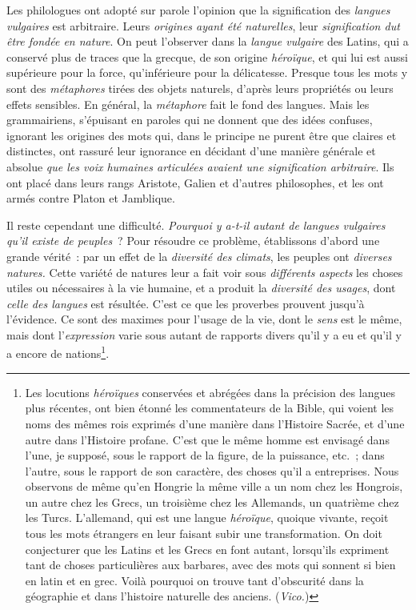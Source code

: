 \documentclass[french,twoside]{book} %
\begin{document}
Les philologues ont adopté sur parole l’opinion que la signification des {\itshape langues vulgaires} est arbitraire. Leurs {\itshape origines ayant été naturelles}, leur {\itshape signification dut être fondée en nature}. On peut l’observer dans la {\itshape langue vulgaire} des Latins, qui a conservé plus de traces que la grecque, de son origine {\itshape héroïque}, et qui lui est aussi supérieure pour la force, qu’inférieure pour la délicatesse. Presque tous les mots y sont des {\itshape métaphores} tirées des objets naturels, d’après leurs propriétés ou leurs effets sensibles. En général, la {\itshape métaphore} fait le fond des langues. Mais les grammairiens, s’épuisant en paroles qui ne donnent que des idées confuses, ignorant les origines des mots qui, dans le principe ne purent être que claires et distinctes, ont rassuré leur ignorance en décidant d’une manière générale et absolue {\itshape que les voix humaines articulées avaient une signification arbitraire}. Ils ont placé dans leurs rangs Aristote, Galien et d’autres philosophes, et les ont armés contre Platon et Jamblique.\par
Il reste cependant une difficulté. {\itshape Pourquoi y a-t-il autant de langues vulgaires qu’il existe de peuples} ? Pour résoudre ce problème, établissons d’abord une grande vérité : par un effet de la {\itshape diversité des climats}, les peuples ont {\itshape diverses natures.}  Cette variété de natures leur a fait voir sous {\itshape différents aspects} les choses utiles ou nécessaires à la vie humaine, et a produit la {\itshape diversité des usages}, dont {\itshape celle des langues} est résultée. C’est ce que les proverbes prouvent jusqu’à l’évidence. Ce sont des maximes pour l’usage de la vie, dont le {\itshape sens} est le même, mais dont l’{\itshape expression} varie sous autant de rapports divers qu’il y a eu et qu’il y a encore de nations\footnote{Les locutions {\itshape héroïques} conservées et abrégées dans la précision des langues plus récentes, ont bien étonné les commentateurs de la Bible, qui voient les noms des mêmes rois exprimés d’une manière dans l’Histoire Sacrée, et d’une autre dans l’Histoire profane. C’est que le même homme est envisagé dans l’une, je supposé, sous le rapport de la figure, de la puissance, etc. ; dans l’autre, sous le rapport de son caractère, des choses qu’il a entreprises. Nous observons de même qu’en Hongrie la même ville a un nom chez les Hongrois, un autre chez les Grecs, un troisième chez les Allemands, un quatrième chez les Turcs. L’allemand, qui est une langue {\itshape héroïque}, quoique vivante, reçoit tous les mots étrangers en leur faisant subir une transformation. On doit conjecturer que les Latins et les Grecs en font autant, lorsqu’ils expriment tant de choses particulières aux barbares, avec des mots qui sonnent si bien en latin et en grec. Voilà pourquoi on trouve tant d’obscurité dans la géographie et dans l’histoire naturelle des anciens. ({\itshape Vico.})}.\par
\end{document}
